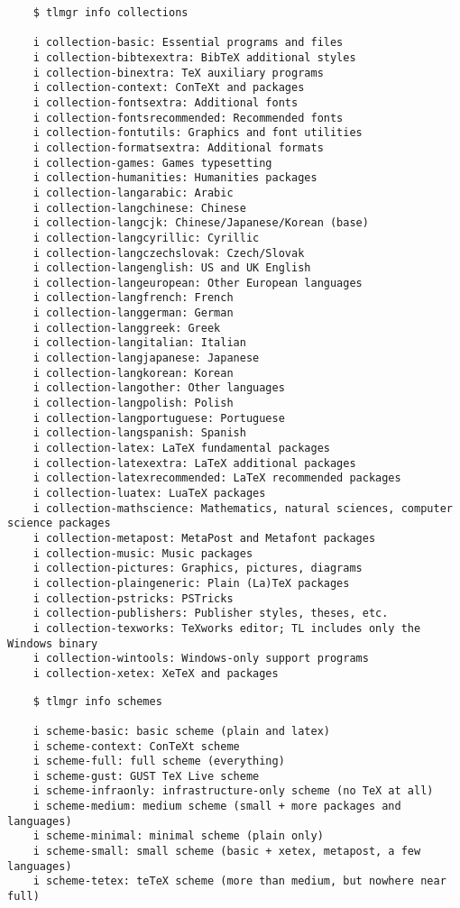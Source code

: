 \begin{lstlisting}
    $ tlmgr info collections

    i collection-basic: Essential programs and files
    i collection-bibtexextra: BibTeX additional styles
    i collection-binextra: TeX auxiliary programs
    i collection-context: ConTeXt and packages
    i collection-fontsextra: Additional fonts
    i collection-fontsrecommended: Recommended fonts
    i collection-fontutils: Graphics and font utilities
    i collection-formatsextra: Additional formats
    i collection-games: Games typesetting
    i collection-humanities: Humanities packages
    i collection-langarabic: Arabic
    i collection-langchinese: Chinese
    i collection-langcjk: Chinese/Japanese/Korean (base)
    i collection-langcyrillic: Cyrillic
    i collection-langczechslovak: Czech/Slovak
    i collection-langenglish: US and UK English
    i collection-langeuropean: Other European languages
    i collection-langfrench: French
    i collection-langgerman: German
    i collection-langgreek: Greek
    i collection-langitalian: Italian
    i collection-langjapanese: Japanese
    i collection-langkorean: Korean
    i collection-langother: Other languages
    i collection-langpolish: Polish
    i collection-langportuguese: Portuguese
    i collection-langspanish: Spanish
    i collection-latex: LaTeX fundamental packages
    i collection-latexextra: LaTeX additional packages
    i collection-latexrecommended: LaTeX recommended packages
    i collection-luatex: LuaTeX packages
    i collection-mathscience: Mathematics, natural sciences, computer science packages
    i collection-metapost: MetaPost and Metafont packages
    i collection-music: Music packages
    i collection-pictures: Graphics, pictures, diagrams
    i collection-plaingeneric: Plain (La)TeX packages
    i collection-pstricks: PSTricks
    i collection-publishers: Publisher styles, theses, etc.
    i collection-texworks: TeXworks editor; TL includes only the Windows binary
    i collection-wintools: Windows-only support programs
    i collection-xetex: XeTeX and packages
\end{lstlisting}
\begin{lstlisting}
    $ tlmgr info schemes

    i scheme-basic: basic scheme (plain and latex)
    i scheme-context: ConTeXt scheme
    i scheme-full: full scheme (everything)
    i scheme-gust: GUST TeX Live scheme
    i scheme-infraonly: infrastructure-only scheme (no TeX at all)
    i scheme-medium: medium scheme (small + more packages and languages)
    i scheme-minimal: minimal scheme (plain only)
    i scheme-small: small scheme (basic + xetex, metapost, a few languages)
    i scheme-tetex: teTeX scheme (more than medium, but nowhere near full)
\end{lstlisting}